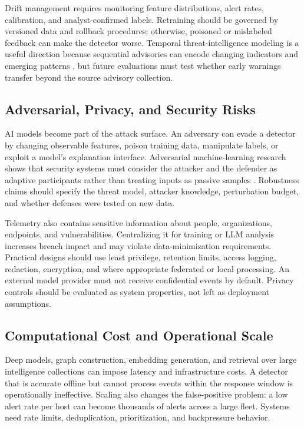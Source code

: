 \documentclass[conference]{IEEEtran}
\begin{document}
Drift management requires monitoring feature distributions, alert rates, calibration, and analyst-confirmed labels. Retraining should be governed by versioned data and rollback procedures; otherwise, poisoned or mislabeled feedback can make the detector worse. Temporal threat-intelligence modeling is a useful direction because sequential advisories can encode changing indicators and emerging patterns \cite{KumarBhatTemporal}, but future evaluations must test whether early warnings transfer beyond the source advisory collection.

\subsection{Adversarial, Privacy, and Security Risks}
AI models become part of the attack surface. An adversary can evade a detector by changing observable features, poison training data, manipulate labels, or exploit a model's explanation interface. Adversarial machine-learning research shows that security systems must consider the attacker and the defender as adaptive participants rather than treating inputs as passive samples \cite{BiggioRoli}. Robustness claims should specify the threat model, attacker knowledge, perturbation budget, and whether defenses were tested on new data.

Telemetry also contains sensitive information about people, organizations, endpoints, and vulnerabilities. Centralizing it for training or LLM analysis increases breach impact and may violate data-minimization requirements. Practical designs should use least privilege, retention limits, access logging, redaction, encryption, and where appropriate federated or local processing. An external model provider must not receive confidential events by default. Privacy controls should be evaluated as system properties, not left as deployment assumptions.

\subsection{Computational Cost and Operational Scale}
Deep models, graph construction, embedding generation, and retrieval over large intelligence collections can impose latency and infrastructure costs. A detector that is accurate offline but cannot process events within the response window is operationally ineffective. Scaling also changes the false-positive problem: a low alert rate per host can become thousands of alerts across a large fleet. Systems need rate limits, deduplication, prioritization, and backpressure behavior.
\end{document}
